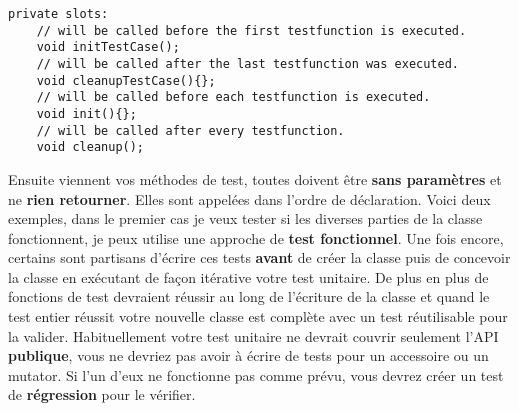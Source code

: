 \begin{verbatim}
private slots:
    // will be called before the first testfunction is executed.
    void initTestCase();
    // will be called after the last testfunction was executed.
    void cleanupTestCase(){};
    // will be called before each testfunction is executed.
    void init(){};
    // will be called after every testfunction.
    void cleanup();
\end{verbatim}

Ensuite viennent vos méthodes de test, toutes doivent être \textbf{sans paramètres} et ne \textbf{rien retourner}. Elles sont appelées dans l'ordre de déclaration. Voici deux exemples, dans le premier cas je veux tester si les diverses parties de la classe fonctionnent, je peux utilise une approche de \textbf{test fonctionnel}. Une fois encore, certains sont partisans d'écrire ces tests \textbf{avant} de créer la classe puis de concevoir la classe en exécutant de façon itérative votre test unitaire. De plus en plus de fonctions de test devraient réussir au long de l'écriture de la classe et quand le test entier réussit votre nouvelle classe est complète avec un test réutilisable pour la valider.
Habituellement votre test unitaire ne devrait couvrir seulement l'API \textbf{publique}, vous ne devriez pas avoir à écrire de tests pour un accessoire ou un mutator. Si l'un d'eux ne fonctionne pas comme prévu, vous devrez créer un test de \textbf{régression} pour le vérifier.


